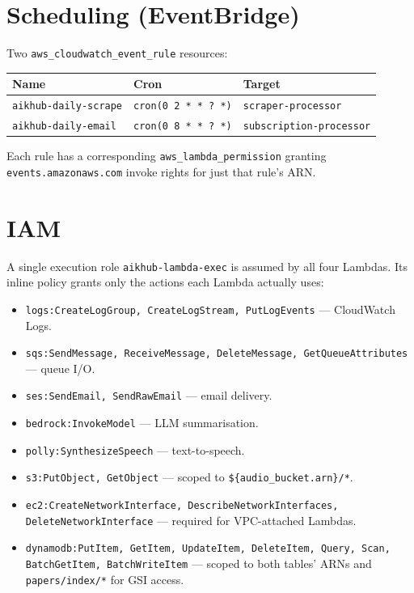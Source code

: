 \documentclass[11pt,a4paper]{article}
\begin{document}
\section{Scheduling (EventBridge)}

Two \texttt{aws\_cloudwatch\_event\_rule} resources:

\begin{center}
\begin{tabular}{lll}
\toprule
\textbf{Name} & \textbf{Cron} & \textbf{Target} \\
\midrule
\texttt{aikhub-daily-scrape} & \texttt{cron(0 2 * * ? *)} & \texttt{scraper-processor} \\
\texttt{aikhub-daily-email}  & \texttt{cron(0 8 * * ? *)} & \texttt{subscription-processor} \\
\bottomrule
\end{tabular}
\end{center}

Each rule has a corresponding \texttt{aws\_lambda\_permission} granting \texttt{events.amazonaws.com} invoke rights for just that rule's ARN.

\section{IAM}

A single execution role \texttt{aikhub-lambda-exec} is assumed by all four Lambdas. Its inline policy grants only the actions each Lambda actually uses:

\begin{itemize}[leftmargin=*]
  \item \texttt{logs:CreateLogGroup, CreateLogStream, PutLogEvents} --- CloudWatch Logs.
  \item \texttt{sqs:SendMessage, ReceiveMessage, DeleteMessage, GetQueueAttributes} --- queue I/O.
  \item \texttt{ses:SendEmail, SendRawEmail} --- email delivery.
  \item \texttt{bedrock:InvokeModel} --- LLM summarisation.
  \item \texttt{polly:SynthesizeSpeech} --- text-to-speech.
  \item \texttt{s3:PutObject, GetObject} --- scoped to \texttt{\$\{audio\_bucket.arn\}/*}.
  \item \texttt{ec2:CreateNetworkInterface, DescribeNetworkInterfaces, DeleteNetworkInterface} --- required for VPC-attached Lambdas.
  \item \texttt{dynamodb:PutItem, GetItem, UpdateItem, DeleteItem, Query, Scan, BatchGetItem, BatchWriteItem} --- scoped to both tables' ARNs and \texttt{papers/index/*} for GSI access.
\end{itemize}
\end{document}
